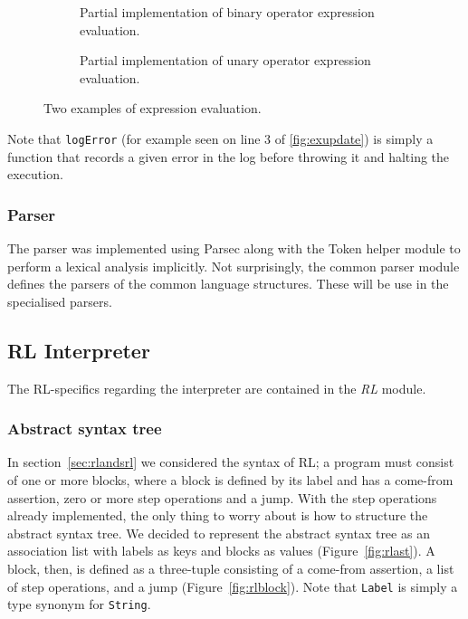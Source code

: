\begin{figure}[h]

  \begin{subfigure}{\textwidth}
    
    \caption{Partial implementation of binary operator expression evaluation.}\label{fig:exbinary}
  \end{subfigure}

  \begin{subfigure}{\textwidth}
    
    \caption{Partial implementation of unary operator expression evaluation.}\label{fig:exunary}
  \end{subfigure}

  \caption{Two examples of expression evaluation.}\label{fig:evalexamples}

\end{figure}

\noindent Note that \texttt{logError} (for example seen on line 3 of \ref{fig:exupdate}) is simply a function that records a given error in the log before throwing it and halting the execution.

\subsubsection{Parser}
The parser was implemented using Parsec along with the Token helper module to perform a lexical analysis implicitly. Not surprisingly, the common parser module defines the parsers of the common language structures. These will be use in the specialised parsers.





\subsection{RL Interpreter}

The RL-specifics regarding the interpreter are contained in the \textit{RL} module.

\subsubsection{Abstract syntax tree}

In section~\ref{sec:rlandsrl} we considered the syntax of RL; a program must consist of one or more blocks, where a block is defined by its label and has a come-from assertion, zero or more step operations and a jump. With the step operations already implemented, the only thing to worry about is how to structure the abstract syntax tree. We decided to represent the abstract syntax tree as an association list with labels as keys and blocks as values (Figure~\ref{fig:rlast}). A block, then, is defined as a three-tuple consisting of a come-from assertion, a list of step operations, and a jump (Figure~\ref{fig:rlblock}). Note that \texttt{Label} is simply a type synonym for \texttt{String}.

